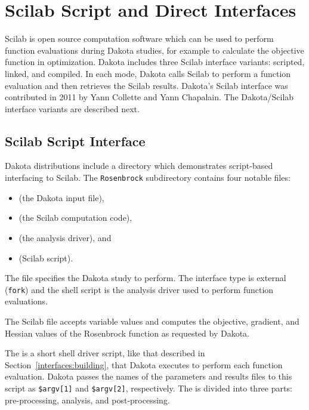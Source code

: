 \section{Scilab Script and Direct Interfaces}\label{advint:scilab}

Scilab is open source computation software which can be used to
perform function evaluations during Dakota studies, for example to
calculate the objective function in optimization. Dakota includes
three Scilab interface variants: scripted, linked, and compiled. In
each mode, Dakota calls Scilab to perform a function evaluation and
then retrieves the Scilab results. Dakota's Scilab interface was
contributed in 2011 by Yann Collette and Yann Chapalain. The
Dakota/Scilab interface variants are described next.

\subsection{Scilab Script Interface} 

Dakota distributions include a directory
 which demonstrates
script-based interfacing to Scilab. The {\tt Rosenbrock} subdirectory
contains four notable files:
\begin{itemize}
  \item {} (the Dakota input file),
  \item {} (the Scilab computation code),
  \item {} (the analysis driver), and
  \item {} (Scilab script).
\end{itemize}

The  file specifies the Dakota
study to perform. The interface type is external ({\tt fork}) and the
shell script  is the analysis
driver used to perform function evaluations.

The Scilab file  accepts variable values and
computes the objective, gradient, and Hessian values of the Rosenbrock
function as requested by Dakota.

The  is a short shell driver
script, like that described in Section~\ref{interfaces:building}, that
Dakota executes to perform each function evaluation. Dakota passes
the names of the parameters and results files to this script as
\texttt{\$argv[1]} and \texttt{\$argv[2]}, respectively. The
 is divided into three parts:
pre-processing, analysis, and post-processing.

